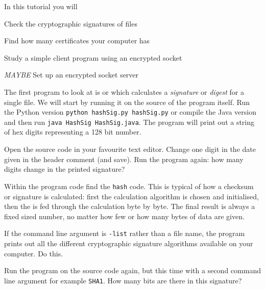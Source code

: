 









In this tutorial you will

\DOT Check the cryptographic signatures of files

\DOT Find how many certificates your computer has

\DOT Study a simple client program using an encrypted socket

\DOT \emph{MAYBE} Set up an encrypted socket server



\STEP The first program to look at is  or 
which calculates a \emph{signature} or \emph{digest} for a single file. We
will start by running it on the source of the program itself. Run the Python
version \texttt{python hashSig.py hashSig.py} or compile the Java version and
then run \texttt{java HashSig HashSig.java}. The program will print out a
string of hex digits representing a 128 bit number.

Open the source code in your favourite text editor. Change one digit in the
 date given in the header comment (and save). Run the program again:
how many digits change in the printed signature?

Within the program code find the \texttt{hash} code. This is typical of how a
checksum or signature is calculated: first the calculation algorithm is chosen and
initialised, then the  is fed through the calculation byte by byte.
The final result is always a fixed sized number, no matter how few or how
many bytes of data are given.

\STEP If the command line argument is \texttt{-list} rather than a file name,
the program prints out all the different cryptographic signature algorithms
available on your computer. Do this.

Run the program on the source code again, but this time with a second command
line argument for example \texttt{SHA1}. How many bits are there in this signature?

